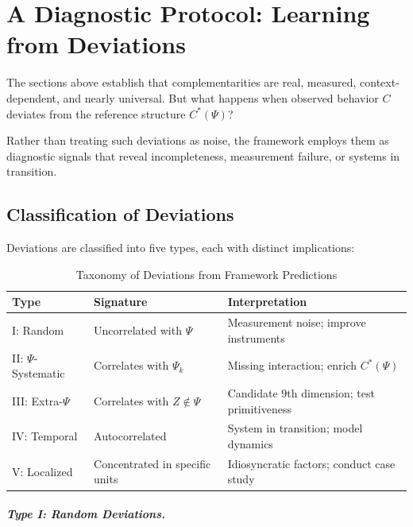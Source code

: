 \documentclass[12pt,oneside]{book}
\begin{document}
\chapter{A Diagnostic Protocol: Learning from Deviations}
\label{sec:diagnostic}

The sections above establish that complementarities are real, measured, context-dependent, and
nearly universal. But what happens when observed behavior $C$ deviates from the reference
structure $C^*(\Psi)$?

Rather than treating such deviations as noise, the framework employs them as diagnostic signals
that reveal incompleteness, measurement failure, or systems in transition.

\section{Classification of Deviations}

Deviations are classified into five types, each with distinct implications:

\begin{table}[htbp]
\centering
\caption{Taxonomy of Deviations from Framework Predictions}
\label{tab:deviations}
\renewcommand{\arraystretch}{1.3}
\begin{tabular}{@{}lp{3cm}p{3cm}@{}}
\toprule
\textbf{Type} & \textbf{Signature} & \textbf{Interpretation} \\
\midrule
I: Random         & Uncorrelated with $\Psi$ & Measurement noise; improve instruments \\
II: $\Psi$-Systematic & Correlates with $\Psi_k$ & Missing interaction; enrich $C^*(\Psi)$ \\
III: Extra-$\Psi$ & Correlates with $Z \notin \Psi$ & Candidate 9th dimension; test primitiveness \\
IV: Temporal    & Autocorrelated & System in transition; model dynamics \\
V: Localized    & Concentrated in specific units & Idiosyncratic factors; conduct case study \\
\bottomrule
\end{tabular}
\end{table}

\paragraph{Type I: Random Deviations.}
\end{document}
